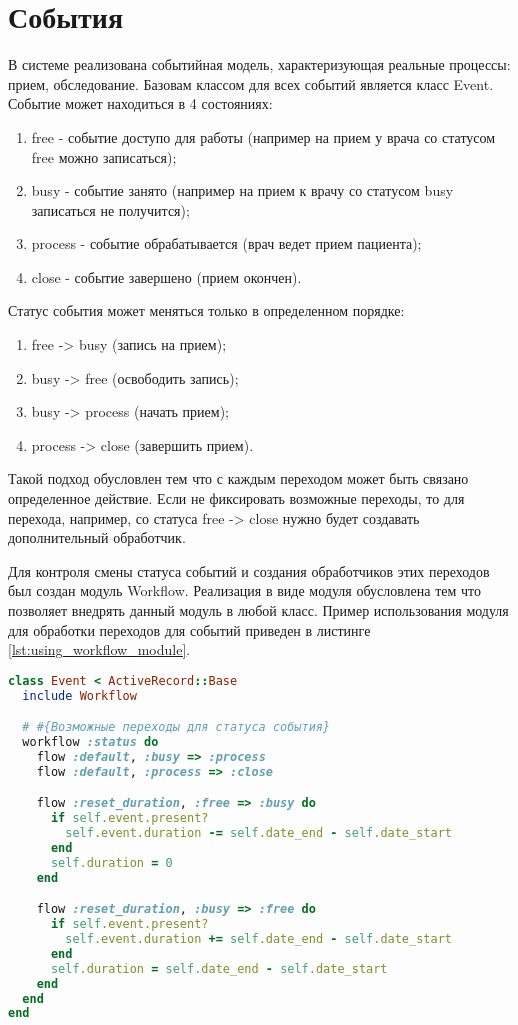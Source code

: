 \section{События}
В системе реализована событийная модель, характеризующая реальные процессы:
прием, обследование. Базовам классом для всех событий является класс Event.
Событие может находиться в 4 состояниях:
\begin{enumerate}
  \item free - событие доступо для работы (например на прием у врача со статусом
  free можно записаться); 
  \item busy - событие занято (например на прием к врачу со статусом busy
  записаться не получится); 
  \item process - событие обрабатывается (врач ведет прием пациента);
  \item close - событие завершено (прием окончен).   
\end{enumerate}

Статус события может меняться только в определенном порядке:
\begin{enumerate}
  \item free -> busy (запись на прием);
  \item busy -> free (освободить запись);
  \item busy -> process (начать прием);
  \item process -> close (завершить прием).
\end{enumerate}

Такой подход обусловлен тем что с каждым переходом может быть связано
определенное действие. Если не фиксировать возможные переходы, то для перехода,
например, со статуса free -> close нужно будет создавать дополнительный
обработчик.

Для контроля смены статуса событий и создания обработчиков этих переходов был
создан модуль Workflow. Реализация в виде модуля обусловлена тем что позволяет
внедрять данный модуль в любой класс. Пример использования модуля для обработки
переходов для событий приведен в листинге \ref{lst:using_workflow_module}.

\begin{lstlisting}[language=Ruby,caption=Использование модуля Workflow
,label={lst:using_workflow_module}] 
class Event < ActiveRecord::Base
  include Workflow

  # #{Возможные переходы для статуса события}
  workflow :status do
    flow :default, :busy => :process
    flow :default, :process => :close

    flow :reset_duration, :free => :busy do
      if self.event.present?
        self.event.duration -= self.date_end - self.date_start
      end
      self.duration = 0
    end

    flow :reset_duration, :busy => :free do
      if self.event.present?
        self.event.duration += self.date_end - self.date_start
      end
      self.duration = self.date_end - self.date_start
    end
  end
end
\end{lstlisting}